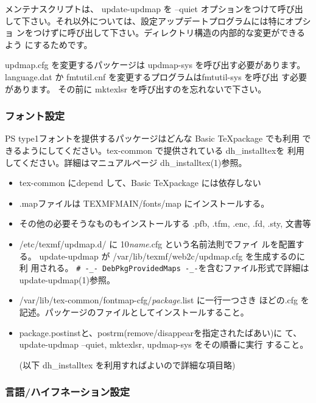 \documentclass[mingoth,a4paper]{jsarticle}
\begin{document}
メンテナスクリプトは、 update-updmap を --quiet オプションをつけて呼び出
して下さい。それ以外については、設定アップデートプログラムには特にオプショ
ンをつけずに呼び出して下さい。ディレクトリ構造の内部的な変更ができるよう
にするためです。

updmap.cfg を変更するパッケージは updmap-sys を呼び出す必要があります。
 language.dat か fmtutil.cnf を変更するプログラムはfmtutil-sys を呼び出
 す必要があります。
その前に mktexlsr を呼び出すのを忘れないで下さい。

\subsubsection{フォント設定}

PS type1フォントを提供するパッケージはどんな Basic \TeX package でも利用
できるようにしてください。tex-common で提供されている dh\_{}installtexを
利用してください。詳細はマニュアルページ dh\_{}installtex(1)参照。

\begin{itemize}
 \item tex-common にdepend して、Basic \TeX package には依存しない
 \item .mapファイルは TEXMFMAIN/fonts/map にインストールする。
 \item その他の必要そうなものもインストールする .pfb, .tfm, .enc, .fd,
       .sty, 文書等
 \item  /etc/texmf/updmap.d/ に 10{\it name}.cfg という名前法則でファイ
       ルを配置する。
       update-updmap が /var/lib/texmf/web2c/updmap.cfg を生成するのに利
       用される。
       \verb!# -_- DebPkgProvidedMaps -_-!を含むファイル形式で詳細は
       update-updmap(1)参照。
 \item /var/lib/tex-common/fontmap-cfg/{\it package}.list に一行一つさき
       ほどの.cfg を記述。パッケージのファイルとしてインストールすること。
 \item package.postinstと、postrm(remove/disappearを指定されたばあい)に
       て、 update-updmap --quiet, mktexlsr, updmap-sys をその順番に実行
       すること。

       (以下 dh\_{}installtex を利用すればよいので詳細な項目略)
       
\end{itemize}

\subsubsection{言語/ハイフネーション設定}
\end{document}
